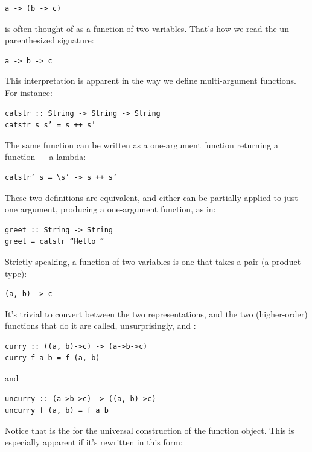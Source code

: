 \begin{verbatim}
a -> (b -> c)
\end{verbatim}

is often thought of as a function of two variables. That's how we read
the un-parenthesized signature:

\begin{verbatim}
a -> b -> c
\end{verbatim}

This interpretation is apparent in the way we define multi-argument
functions. For instance:

\begin{verbatim}
catstr :: String -> String -> String
catstr s s’ = s ++ s’
\end{verbatim}

The same function can be written as a one-argument function returning a
function --- a lambda:

\begin{verbatim}
catstr’ s = \s’ -> s ++ s’
\end{verbatim}

These two definitions are equivalent, and either can be partially
applied to just one argument, producing a one-argument function, as in:

\begin{verbatim}
greet :: String -> String
greet = catstr “Hello “
\end{verbatim}

Strictly speaking, a function of two variables is one that takes a pair
(a product type):

\begin{verbatim}
(a, b) -> c
\end{verbatim}

It's trivial to convert between the two representations, and the two
(higher-order) functions that do it are called, unsurprisingly,
 and :

\begin{verbatim}
curry :: ((a, b)->c) -> (a->b->c)
curry f a b = f (a, b)
\end{verbatim}

and

\begin{verbatim}
uncurry :: (a->b->c) -> ((a, b)->c)
uncurry f (a, b) = f a b
\end{verbatim}

Notice that  is the  for the universal
construction of the function object. This is especially apparent if it's
rewritten in this form:

